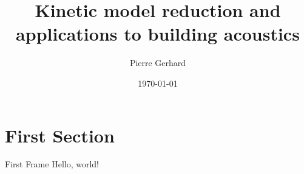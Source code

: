 \documentclass{beamer}
\title{Kinetic model reduction and applications to building acoustics}
\date{\today}
\author{Pierre Gerhard}
\institute{Université de Strasbourg}
\begin{document}
  \maketitle
  \section{First Section}
  \begin{frame}{First Frame}
    Hello, world!
  \end{frame}
\end{document}
